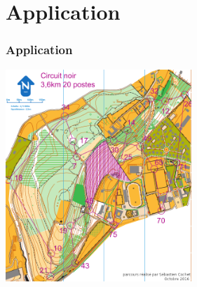 \documentclass[svgnames,11pt]{beamer}
\begin{document}
\section{Application}
\begin{frame}
    \frametitle{Application}

    \begin{center}
        \centering
        \includegraphics[width=7cm]{ressources/co-noir.png}
    \end{center}

\end{frame}
\end{document}
